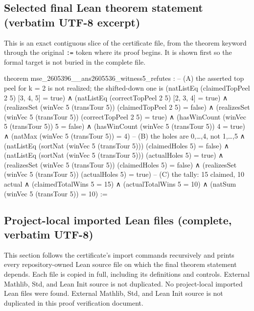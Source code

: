 \documentclass[11pt]{article}
\begin{document}
\subsection*{Selected final Lean theorem statement (verbatim UTF-8 excerpt)}
This is an exact contiguous slice of the certificate file, from the theorem keyword through the original \texttt{:=} token where its proof begins. It is shown first so the formal target is not buried in the complete file.
\begin{Vlean}
theorem mse_2605396__ans2605536_witness5_refutes :
    -- (A) the asserted top peel for k = 2 is not realized; the shifted-down one is
    (natListEq (claimedTopPeel 2 5) [3, 4, 5] = true)
  ∧ (natListEq (correctTopPeel 2 5) [2, 3, 4] = true)
  ∧ (realizesSet (winVec 5 (transTour 5)) (claimedTopPeel 2 5) = false)
  ∧ (realizesSet (winVec 5 (transTour 5)) (correctTopPeel 2 5) = true)
  ∧ (hasWinCount (winVec 5 (transTour 5)) 5 = false)
  ∧ (hasWinCount (winVec 5 (transTour 5)) 4 = true)
  ∧ (natMax (winVec 5 (transTour 5)) = 4)
    -- (B) the holes are {0,…,4}, not {1,…,5}
  ∧ (natListEq (sortNat (winVec 5 (transTour 5))) (claimedHoles 5) = false)
  ∧ (natListEq (sortNat (winVec 5 (transTour 5))) (actualHoles 5) = true)
  ∧ (realizesSet (winVec 5 (transTour 5)) (claimedHoles 5) = false)
  ∧ (realizesSet (winVec 5 (transTour 5)) (actualHoles 5) = true)
    -- (C) the tally: 15 claimed, 10 actual
  ∧ (claimedTotalWins 5 = 15)
  ∧ (actualTotalWins 5 = 10)
  ∧ (natSum (winVec 5 (transTour 5)) = 10) :=
\end{Vlean}
\subsection*{Project-local imported Lean files (complete, verbatim UTF-8)}
This section follows the certificate's import commands recursively and prints every repository-owned Lean source file on which the final theorem statement depends. Each file is copied in full, including its definitions and controls. External Mathlib, Std, and Lean Init source is not duplicated.
No project-local imported Lean files were found. External Mathlib, Std, and Lean Init source is not duplicated in this proof verification document.
\end{document}
